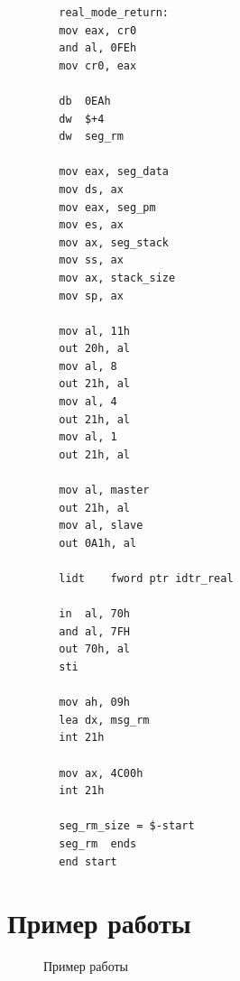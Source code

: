 \documentclass[14pt, a4paper]{extarticle}
\begin{document}
\begin{lstlisting}
		real_mode_return:
		mov	eax, cr0
		and	al, 0FEh
		mov	cr0, eax
		
		db	0EAh
		dw	$+4
		dw	seg_rm
		
		mov	eax, seg_data	
		mov	ds, ax          
		mov eax, seg_pm
		mov	es, ax
		mov	ax, seg_stack
		mov	ss, ax
		mov	ax, stack_size
		mov	sp, ax
		
		mov	al, 11h						
		out	20h, al						
		mov	al, 8    				    
		out	21h, al						
		mov	al, 4						
		out	21h, al                    
		mov	al, 1						
		out	21h, al                     
		
		mov	al, master 
		out	21h, al
		mov	al, slave
		out	0A1h, al
		
		lidt	fword ptr idtr_real
		
		in	al, 70h 
		and	al, 7FH
		out	70h, al
		sti     
		
		mov ah, 09h
		lea dx, msg_rm
		int 21h
		
		mov	ax, 4C00h
		int	21h
		
		seg_rm_size = $-start 	
		seg_rm	ends
		end start
	\end{lstlisting}
	\newpage
	
	\section{Пример работы}
	\begin{figure}[h!]
		\caption{Пример работы}
	\end{figure}
	
\end{document}
